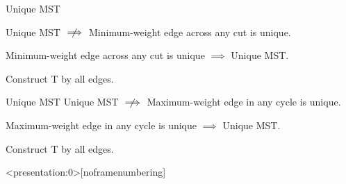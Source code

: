\begin{frame}{}
  \begin{exampleblock}{Unique MST }
    \centerline{Unique MST $\centernot\implies$ Minimum-weight edge across any cut is unique.}
  \end{exampleblock}

  \pause

  \pause
  \begin{theorem}
    \centerline{Minimum-weight edge across any cut is unique $\implies$ Unique MST.}
  \end{theorem}

  \pause
  \begin{center}
	Construct T by  all  edges.
  \end{center}
\end{frame}

\begin{frame}{}
  \begin{exampleblock}{Unique MST }
    Unique MST $\centernot\implies$ Maximum-weight edge in any cycle is unique.
  \end{exampleblock}

  \pause

  \pause
  \begin{theorem}
    \centerline{Maximum-weight edge in any cycle is unique $\implies$ Unique MST.}
  \end{theorem}

  \pause
  \begin{center}
	Construct T by  all  edges.
  \end{center}
\end{frame}

\begin{frame}<presentation:0>[noframenumbering]

  \begin{columns}
  \end{columns}
\end{frame}

